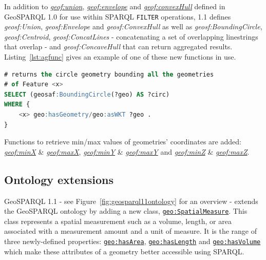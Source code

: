 \documentclass[runningheads]{llncs}
\begin{document}
In addition to \href{http://www.opengis.net/def/function/geosparql/union}{\emph{geof:union}}, \href{http://www.opengis.net/def/function/geosparql/envelope}{\emph{geof:envelope}} and \href{http://www.opengis.net/def/function/geosparql/convexHull}{\emph{geof:convexHull}} defined in GeoSPARQL 1.0 
for use within SPARQL \texttt{FILTER} operations, 1.1 defines \emph{geosf:Union}, \emph{geosf:Envelope} and \emph{geosf:ConvexHull}
as well as \emph{geosf:BoundingCircle}, \emph{geosf:Centroid}, \emph{geosf:ConcatLines} - concatenating a set of overlapping linestrings 
that overlap - and \emph{geosf:ConcaveHull} that can return aggregated results. Listing~\ref{lst:agfunc} gives an example 
of one of these new functions in use.
\small
\begin{lstlisting}[caption=Aggregation Function example SPARQL query,label=lst:agfunc,language=sql,frame=single,basicstyle=\ttfamily,showstringspaces=false]
# returns the circle geometry bounding all the geometries 
# of Feature <x>
SELECT (geosaf:BoundingCircle(?geo) AS ?circ)
WHERE {
    <x> geo:hasGeometry/geo:asWKT ?geo .
}
\end{lstlisting}
\normalsize

Functions to retrieve min/max values of geometries' coordinates are added: \href{http://www.opengis.net/def/function/geosparql/minX}{\emph{geof:minX}} \& \href{http://www.opengis.net/def/function/geosparql/maxX}{\emph{geof:maxX}},
\href{http://www.opengis.net/def/function/geosparql/minY}{\emph{geof:minY}} \& \href{http://www.opengis.net/def/function/geosparql/maxY}{\emph{geof:maxY}} and \href{http://www.opengis.net/def/function/geosparql/minZ}{\emph{geof:minZ}} \& \href{http://www.opengis.net/def/function/geosparql/maxZ}{\emph{geof:maxZ}}.

\subsection{Ontology extensions}\label{sec:ontexts}
GeoSPARQL 1.1 - see Figure~\ref{fig:geosparql11ontology} for an overview - extends the GeoSPARQL ontology by adding a new class, \href{http://www.opengis.net/ont/geosparql#SpatialMeasure}{\texttt{geo:SpatialMeasure}}. This class represents a spatial measurement 
such as a volume, length, or area associated with a measurement amount and a unit of measure. It is the range of three newly-defined properties:
\href{http://www.opengis.net/ont/geosparql#hasArea}{\texttt{geo:hasArea}}, \href{http://www.opengis.net/ont/geosparql#hasLength}{\texttt{geo:hasLength}} and \href{http://www.opengis.net/ont/geosparql#hasVolume}{\texttt{geo:hasVolume}} which make these attributes of a geometry better accessible using 
SPARQL. 
\end{document}
